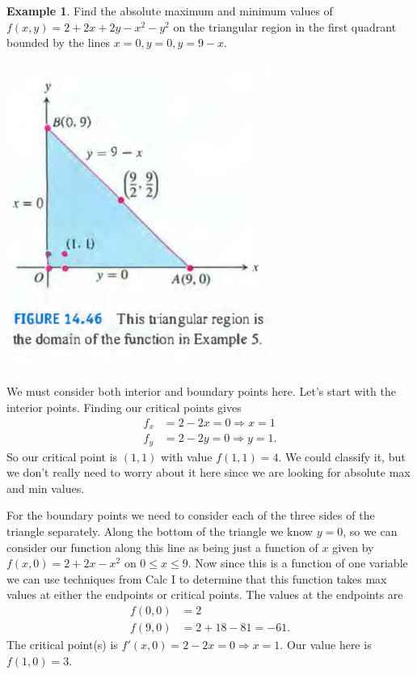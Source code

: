 \documentclass[12pt, letter]{article}
\theoremstyle{plain}
\numberwithin{theorem}{section}
\theoremstyle{definition}
\newtheorem{example}[theorem]{Example}
\begin{document}
\begin{example}
Find the absolute maximum and minimum values of $f(x,y) = 2+2x+2y-x^2-y^2$ on the triangular region in the first quadrant bounded by the lines $x=0,y=0,y=9-x$.

\bigskip

\begin{center}
\includegraphics[scale=0.7]{m2_f9}
\end{center}

\bigskip

We must consider both interior and boundary points here. Let's start with the interior points. Finding our critical points gives
\begin{align*}
f_x &= 2-2x =0 \Rightarrow x=1\\
f_y &= 2-2y = 0 \Rightarrow y=1.
\end{align*}
So our critical point is $(1,1)$ with value $f(1,1) = 4$. We could classify it, but we don't really need to worry about it here since we are looking for absolute max and min values.

\smallskip

For the boundary points we need to consider each of the three sides of the triangle separately. Along the bottom of the triangle we know $y=0$, so we can consider our function along this line as being just a function of $x$ given by $f(x,0) = 2+2x-x^2$ on $0\leq x\leq 9$. Now since this is a function of one variable we can use techniques from Calc I to determine that this function takes max values at either the endpoints or critical points. The values at the endpoints are
\begin{align*}
f(0,0) &= 2\\
f(9,0) &= 2+18-81 = -61.
\end{align*}
The critical point(s) is $f'(x,0) = 2-2x =0 \Rightarrow x=1$. Our value here is $f(1,0) = 3.$


\end{example}
\end{document}
